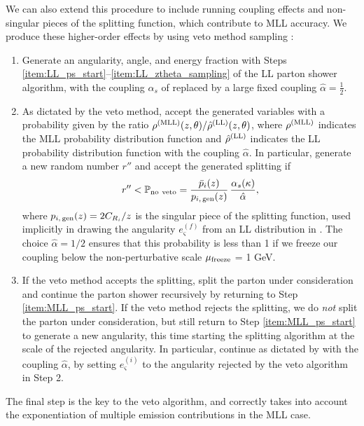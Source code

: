 We can also extend this procedure to include running coupling effects and non-singular pieces of the splitting function, which contribute to MLL accuracy.
%
We produce these higher-order effects by using veto method sampling \cite{Sjostrand:2007gs,Larkoski:2013paa,Sjostrand:2014zea}:
%
\begin{enumerate}
	\item
	\label{item:MLL_ps_start}
	Generate an angularity, angle, and energy fraction with Steps \ref{item:LL_ps_start}--\ref{item:LL_ztheta_sampling} of the LL parton shower algorithm, with the coupling \(\alpha_s\) of  replaced by a large fixed coupling \(\hat\alpha = \frac{1}{2}\).

	\item
	As dictated by the veto method, accept the generated variables with a probability given by the ratio \(\rho^{\rm(MLL)}(z,\theta)/\hat\rho^{\rm(LL)}(z,\theta)\), where \(\rho^{\rm(MLL)}\) indicates the MLL probability distribution function and \(\hat\rho^{\rm(LL)}\) indicates the LL probability distribution function with the coupling \(\hat\alpha\).
	In particular, generate a new random number \(r''\) and accept the generated splitting if
	\begin{align}
	    r'' < \mathbb{P}_{\rm no~veto}
	    =
	    \frac{\bar{p}_i(z)}{p_{i,\,\rm gen}(z)}\,\frac{\alpha_s(\kappa)}{\hat\alpha}
	    ,
	\end{align}
	where \(p_{i,\,\rm gen}(z) = 2 C_{R_i} / z\) is the singular piece of the splitting function, used implicitly in drawing the angularity \(e_\varsigma^{(f)}\) from an LL distribution in .
    The choice \(\hat \alpha = 1/2\) ensures that this probability is less than 1 if we freeze our coupling below the non-perturbative scale \(\mu_{\rm freeze}\) = 1 GeV.

	\item
	If the veto method accepts the splitting, split the parton under consideration and continue the parton shower recursively by returning to Step \ref{item:MLL_ps_start}.
	If the veto method rejects the splitting, we do \textit{not} split the parton under consideration, but still return to Step \ref{item:MLL_ps_start} to generate a new angularity, this time starting the splitting algorithm at the scale of the rejected angularity.
	In particular, continue as dictated by  with the coupling \(\hat\alpha\), by setting \(e_\varsigma^{(i)}\) to the angularity rejected by the veto algorithm in Step 2.
\end{enumerate}
%
The final step is the key to the veto algorithm, and correctly takes into account the exponentiation of multiple emission contributions in the MLL case.

